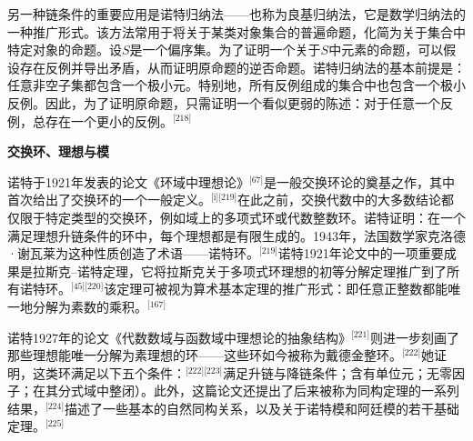 另一种链条件的重要应用是诺特归纳法——也称为良基归纳法，它是数学归纳法的一种推广形式。该方法常用于将关于某类对象集合的普遍命题，化简为关于集合中特定对象的命题。设$S$是一个偏序集。为了证明一个关于$S$中元素的命题，可以假设存在反例并导出矛盾，从而证明原命题的逆否命题。诺特归纳法的基本前提是：任意非空子集都包含一个极小元。特别地，所有反例组成的集合中也包含一个极小反例。因此，为了证明原命题，只需证明一个看似更弱的陈述：对于任意一个反例，总存在一个更小的反例。\(^\text{[218]}\)

\textbf{交换环、理想与模}

诺特于1921年发表的论文《环域中理想论》\(^\text{[67]}\)是一般交换环论的奠基之作，其中首次给出了交换环的一个一般定义。\(^\text{[i][219]}\)在此之前，交换代数中的大多数结论都仅限于特定类型的交换环，例如域上的多项式环或代数整数环。诺特证明：在一个满足理想升链条件的环中，每个理想都是有限生成的。1943年，法国数学家克洛德·谢瓦莱为这种性质创造了术语——诺特环。\(^\text{[219]}\)诺特1921年论文中的一项重要成果是拉斯克–诺特定理，它将拉斯克关于多项式环理想的初等分解定理推广到了所有诺特环。\(^\text{[45][220]}\)该定理可被视为算术基本定理的推广形式：即任意正整数都能唯一地分解为素数的乘积。\(^\text{[167]}\)

诺特1927年的论文《代数数域与函数域中理想论的抽象结构》\(^\text{[221]}\)则进一步刻画了那些理想能唯一分解为素理想的环——这些环如今被称为戴德金整环。\(^\text{[222]}\)她证明，这类环满足以下五个条件：\(^\text{[222][223]}\)满足升链与降链条件；含有单位元；无零因子；在其分式域中整闭）。此外，这篇论文还提出了后来被称为同构定理的一系列结果，\(^\text{[224]}\)描述了一些基本的自然同构关系，以及关于诺特模和阿廷模的若干基础定理。\(^\text{[225]}\)
